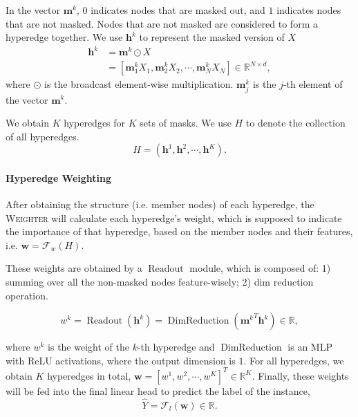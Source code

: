 In the vector $\boldsymbol{m}^k$, $0$ indicates nodes that are masked out, and $1$ indicates nodes that are not masked. Nodes that are not masked are considered to form a hyperedge together. We use $\boldsymbol{h}^k$ to represent the masked version of $X$
\begin{equation}
\begin{aligned}
    \boldsymbol{h}^k &= \boldsymbol{m}^k \odot X \\&= [\boldsymbol{m}^k_1 X_1, \boldsymbol{m}^k_2 X_2, \cdots, \boldsymbol{m}^k_N X_N] \in \mathbb{R}^{N\times d},   
\end{aligned}
\end{equation}
where $\odot$ is the broadcast element-wise multiplication. $\boldsymbol{m}^k_j$ is the $j$-th element of the vector $\boldsymbol{m}^k$.  

We obtain $K$ hyperedges for $K$ sets of masks. We use $H$ to denote the collection of all hyperedges.
\begin{equation}
    H = (\boldsymbol{h}^1, \boldsymbol{h}^2, \cdots, \boldsymbol{h}^K).
\end{equation} 

\paragraph{Hyperedge Weighting}
After obtaining the structure (i.e. member nodes) of each hyperedge,  the \textsc{Weighter} will calculate each hyperedge's weight, which is supposed to indicate the importance of that hyperedge, based on the member nodes and their features, i.e. $\boldsymbol{w} = \mathcal{F}_w(H)$.

These weights are obtained by a $\operatorname{Readout}$ module, which is composed of: 1) summing over all the non-masked nodes feature-wisely; 2) dim reduction operation.

\begin{equation}
\label{equ:readout}
    w^k = \operatorname{Readout}(\boldsymbol{h}^k) = \operatorname{DimReduction}({\boldsymbol{m}^k}^T\boldsymbol{h}^k) \in \mathbb{R},
\end{equation}

where $w^k$ is the weight of the $k$-th hyperedge and $\operatorname{DimReduction}$ is an MLP with ReLU activations, where the output dimension is $1$.
For all hyperedges, we obtain $K$ hyperedges in total, $\boldsymbol{w} = [w^1, w^2, \cdots, w^K]^T \in \mathbb{R}^K$. Finally, these weights will be fed into the final linear head to predict the label of the instance, 
\begin{equation}
\label{equ:linearhead}
    \hat{Y} = \mathcal{F}_l(\boldsymbol{w}) \in \mathbb{R}.
\end{equation}

